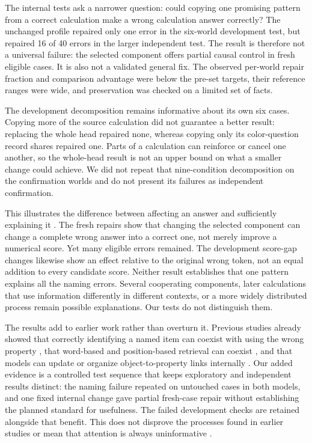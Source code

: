 \documentclass[10pt,letterpaper]{article}
\begin{document}
The internal tests ask a narrower question: could copying one promising pattern from a correct calculation make a wrong calculation answer correctly? The unchanged profile repaired only one error in the six-world development test, but repaired 16 of 40 errors in the larger independent test. The result is therefore not a universal failure: the selected component offers partial causal control in fresh eligible cases. It is also not a validated general fix. The observed per-world repair fraction and comparison advantage were below the pre-set targets, their reference ranges were wide, and preservation was checked on a limited set of facts.


The development decomposition remains informative about its own six cases. Copying more of the source calculation did not guarantee a better result: replacing the whole head repaired none, whereas copying only its color-question record shares repaired one. Parts of a calculation can reinforce or cancel one another, so the whole-head result is not an upper bound on what a smaller change could achieve. We did not repeat that nine-condition decomposition on the confirmation worlds and do not present its failures as independent confirmation.


This illustrates the difference between affecting an answer and sufficiently explaining it \cite{zhangnanda2024patching,geiger2025causal}. The fresh repairs show that changing the selected component can change a complete wrong answer into a correct one, not merely improve a numerical score. Yet many eligible errors remained. The development score-gap changes likewise show an effect relative to the original wrong token, not an equal addition to every candidate score. Neither result establishes that one pattern explains all the naming errors. Several cooperating components, later calculations that use information differently in different contexts, or a more widely distributed process remain possible explanations. Our tests do not distinguish them.


The results add to earlier work rather than overturn it. Previous studies already showed that correctly identifying a named item can coexist with using the wrong property \cite{yang2026import}, that word-based and position-based retrieval can coexist \cite{gurarieh2026mixing}, and that models can update or organize object-to-property links internally \cite{ohdemberg2026retrieval,dai2026cell}. Our added evidence is a controlled test sequence that keeps exploratory and independent results distinct: the naming failure repeated on untouched cases in both models, and one fixed internal change gave partial fresh-case repair without establishing the planned standard for usefulness. The failed development checks are retained alongside that benefit. This does not disprove the processes found in earlier studies or mean that attention is always uninformative \cite{jainwallace2019attention,wiegreffepinter2019attention}.
\end{document}
